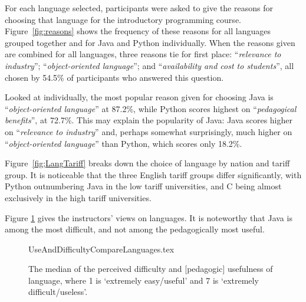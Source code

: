 \documentclass{sig-alternate}
\begin{document}
For each language selected, participants were asked to give the
reasons for choosing that language for the introductory programming
course. Figure~\ref{fig:reasons} shows the frequency of these reasons
for all languages grouped together and for Java and Python
individually. When the reasons given are combined for all languages,
three reasons tie for first place: ``{\emph{relevance to industry}}'';
``{\emph{object-oriented language}}''; and ``{\emph{availability and
cost to students}}'', all chosen by 54.5\% of participants who
answered this question.

Looked at individually, the most popular reason given for choosing
Java is ``{\emph{object-oriented language}}'' at 87.2\%, while Python
scores highest on ``{\emph{pedagogical benefits}}'', at 72.7\%. This
may explain the popularity of Java: Java scores higher on
``{\emph{relevance to industry}}'' and, perhaps somewhat surprisingly,
much higher on ``{\emph{object-oriented language}}'' than Python,
which scores only 18.2\%.


Figure~\ref{fig;LangTariff} breaks down the choice of language by
nation and tariff group.  It is noticeable that the three English
tariff groups differ significantly, with Python outnumbering Java in
the low tariff universities, and C being almost exclusively in the
high tariff universities.



Figure \ref{fig:utility} gives the instructors' views on languages. It
is noteworthy that Java is among the most difficult, and not among the
pedagogically most useful.

\begin{figure}
\begin{center}
{UseAndDifficultyCompareLanguages.tex}
\end{center}\vskip-18pt
\caption{The median of the perceived difficulty and [pedagogic] usefulness of language, where 1 is `extremely easy/useful' and 7 is `extremely difficult/useless'.%
\label{fig:utility}}
\end{figure}
\end{document}
